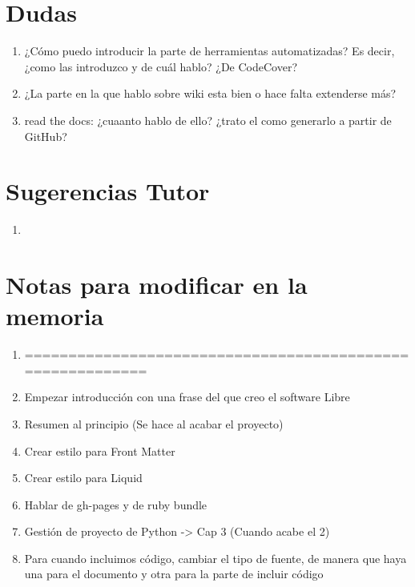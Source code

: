\documentclass[a4paper, 12pt]{book}
\begin{document}
\chapter*{Dudas}
\begin{enumerate}
    \item ¿Cómo puedo introducir la parte de herramientas automatizadas? Es decir, ¿como las introduzco y de cuál hablo? ¿De CodeCover?
    \item ¿La parte en la que hablo sobre wiki esta bien o hace falta extenderse más?
    \item read the docs: ¿cuaanto hablo de ello? ¿trato el como generarlo a partir de GitHub?
\end{enumerate}
\chapter*{Sugerencias Tutor}
\begin{enumerate}
    \item 
\end{enumerate}

\chapter*{Notas para modificar en la memoria}
\begin{enumerate}
    \item ==========================================================
    \item Empezar introducción con una frase del que creo el software Libre
    \item Resumen al principio (Se hace al acabar el proyecto)
    \item Crear estilo para Front Matter
    \item Crear estilo para Liquid
    \item Hablar de gh-pages y de ruby bundle
    \item Gestión de proyecto de Python -> Cap 3 (Cuando acabe el 2)
    \item Para cuando incluimos código, cambiar el tipo de fuente, de manera que haya una para el documento y otra para la parte de incluir código
\end{enumerate}
\end{document}
